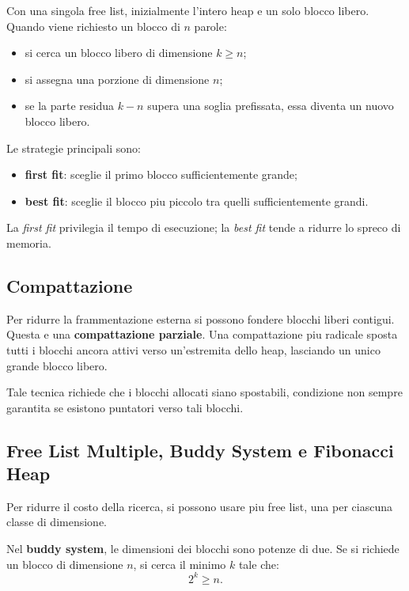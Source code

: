 \documentclass{article}
\begin{document}
Con una singola free list, inizialmente l'intero heap e un solo blocco libero. Quando viene richiesto un blocco di $n$ parole:

\begin{itemize}
  \item si cerca un blocco libero di dimensione $k \geq n$;
  \item si assegna una porzione di dimensione $n$;
  \item se la parte residua $k-n$ supera una soglia prefissata, essa diventa un nuovo blocco libero.
\end{itemize}

Le strategie principali sono:

\begin{itemize}
  \item \textbf{first fit}: sceglie il primo blocco sufficientemente grande;
  \item \textbf{best fit}: sceglie il blocco piu piccolo tra quelli sufficientemente grandi.
\end{itemize}

La \textit{first fit} privilegia il tempo di esecuzione; la \textit{best fit} tende a ridurre lo spreco di memoria.

\subsection{Compattazione}

Per ridurre la frammentazione esterna si possono fondere blocchi liberi contigui. Questa e una \textbf{compattazione parziale}. Una compattazione piu radicale sposta tutti i blocchi ancora attivi verso un'estremita dello heap, lasciando un unico grande blocco libero.

Tale tecnica richiede che i blocchi allocati siano spostabili, condizione non sempre garantita se esistono puntatori verso tali blocchi.

\subsection{Free List Multiple, Buddy System e Fibonacci Heap}

Per ridurre il costo della ricerca, si possono usare piu free list, una per ciascuna classe di dimensione.

Nel \textbf{buddy system}, le dimensioni dei blocchi sono potenze di due. Se si richiede un blocco di dimensione $n$, si cerca il minimo $k$ tale che:
\[
2^k \geq n.
\]
\end{document}

